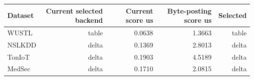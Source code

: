 \begin{tabular}{lrrrr}
\toprule
Dataset & Current selected backend & Current score us & Byte-posting score us & Selected \\
\midrule
WUSTL & table & 0.0638 & 1.3663 & table \\
NSLKDD & delta & 0.1369 & 2.8013 & delta \\
TonIoT & delta & 0.1903 & 4.5189 & delta \\
MedSec & delta & 0.1710 & 2.0815 & delta \\
\bottomrule
\end{tabular}
